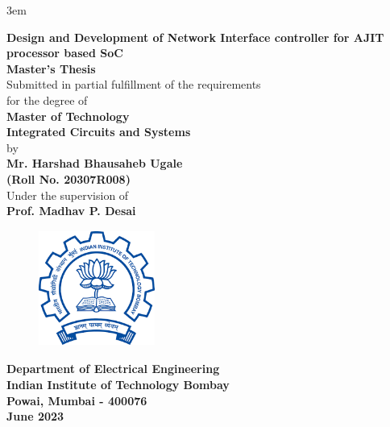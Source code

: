 \documentclass[a4paper,11pt, final]{report}
\begin{document}
	\emergencystretch 3em
  \thispagestyle{empty}
  \vspace*{1cm}
  {\centering     
  \textbf{\LARGE Design and Development of Network Interface controller for AJIT processor based SoC}\\
  \vspace{1.20cm}
  \textbf{\large Master's Thesis}\\
  \vspace{1cm}
  {Submitted in partial fulfillment of the requirements}\\
  \vspace{0.25cm}
  {for the degree of}\\
  \vspace{1cm}
  \textbf{ Master of Technology}\\
  \textbf{Integrated Circuits and Systems}\\
  \vspace{1.50cm}
  {by}\\
  \vspace{0.20cm}
  \textbf{\large Mr. Harshad Bhausaheb Ugale}\\
  \vspace{0.25cm}
  \textbf{\large (Roll No. 20307R008)}\\
  \vspace{1.8cm}
  {Under the supervision of}\\
  \vspace{0.20cm}
  \textbf{\large Prof. Madhav P. Desai}\\
    \vspace{0.30cm}
  \vspace{1.450cm}
    \begin{figure}[htb]
    \begin{center}
    \includegraphics[height=1.5in,width=1.5in]{logo.png}
    \end{center}
    \end{figure}

    
  {\textbf{Department of Electrical Engineering}}\\
  {\textbf{Indian Institute of Technology Bombay}}\\
  {\textbf{Powai, Mumbai - 400076}}\\
  {\textbf{June 2023}}
 
 }
 
\end{document}
